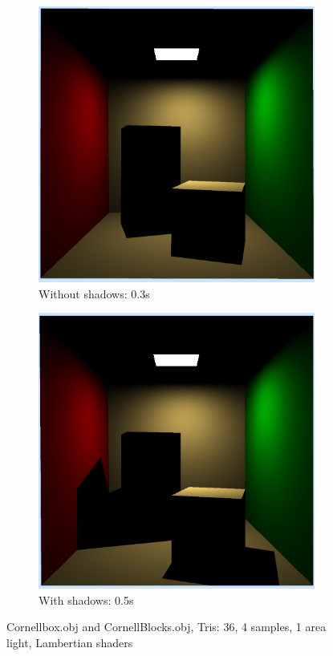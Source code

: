 \begin{figure}
	\centering
	\begin{subfigure}[b]{0.4\textwidth}
		\includegraphics[width=\textwidth]{week1/arealight_noshadows.png}
		\caption{Without shadows: 0.3s}
		\label{fig:arealightnoshadows}
	\end{subfigure}
	\begin{subfigure}[b]{0.4\textwidth}
		\includegraphics[width=\textwidth]{week1/arealight_shadows.png}
		\caption{With shadows: 0.5s}
		\label{fig:arealightshadows}
	\end{subfigure}
	\caption{Cornellbox.obj and CornellBlocks.obj, Tris: 36, 4 samples, 1 area light, Lambertian shaders}
	\label{fig:arealight}
\end{figure}


